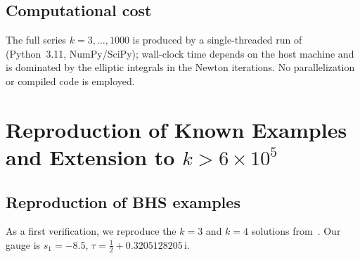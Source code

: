 \documentclass[11pt,a4paper]{article}
\theoremstyle{plain}
\theoremstyle{definition}
\theoremstyle{remark}
\newcommand{\ii}{\mathrm{i}}
\begin{document}
\subsection{Computational cost}
The full series $k = 3, \ldots, 1000$ is produced by a single-threaded
run of  (Python~3.11,
NumPy/SciPy); wall-clock time depends on the host machine and is
dominated by the elliptic integrals in the Newton iterations.  No
parallelization or compiled code is employed.


\section{Reproduction of Known Examples and Extension to
  \texorpdfstring{$k > 6\times 10^5$}{k > 600000}}\label{sec:extension}

\subsection{Reproduction of BHS examples}\label{sec:repro}
As a first verification, we reproduce the $k = 3$ and $k = 4$
solutions from~\cite{BHS25}.  Our gauge is $s_1 = -8.5$,
$\tau = \tfrac12 + 0.3205128205\,\ii$.
\end{document}
